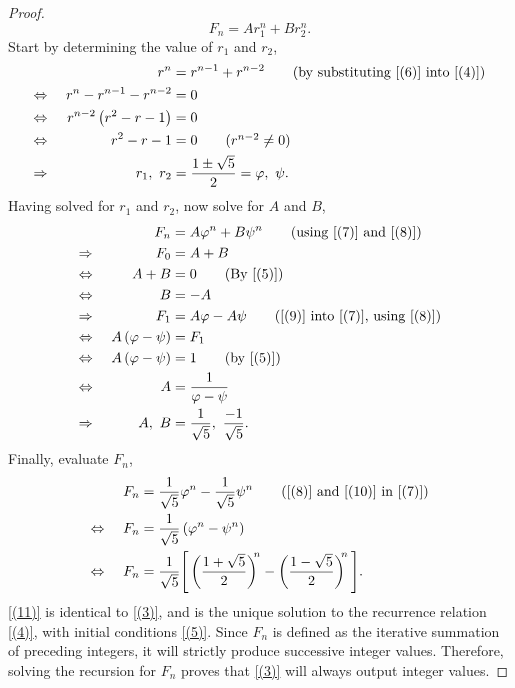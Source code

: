 \documentclass{article}
\begin{document}
\begin{proof}
\begin{equation}
        F_n = Ar_1^n + Br_2^n.
    \end{equation}
    Start by determining the value of $r_1$ and $r_2$,
    \begin{alignat}{2}
        && r^n &= r^{n-1} + r^{n-2} \nonumber \tag{by substituting \eqref{(6)} into \eqref{(4)}} \nonumber \\
        \Leftrightarrow&& \ r^n - r^{n-1} - r^{n-2} &= 0 \nonumber \\
        \Leftrightarrow&& r^{n-2} \left(r^2 - r - 1 \right) &= 0 \nonumber \\
        \Leftrightarrow&& r^2 - r - 1 &= 0 \nonumber \tag{$r^{n-2} \neq 0$} \\
        \label{(8)} \Rightarrow&& r_1,\ r_2 &= \frac{1\pm\sqrt{5}}{2} = \varphi,\ \psi.
    \end{alignat}
    Having solved for $r_1$ and $r_2$, now solve for $A$ and $B$,
    \begin{alignat}{2}
        && F_n &= A\varphi^n + B\psi^n \nonumber \tag{using \eqref{(7)} and \eqref{(8)}} \\
        \Rightarrow&& F_0 &= A + B \nonumber \\
        \Leftrightarrow&& A + B &= 0 \nonumber \tag{By \eqref{(5)}} \\
        \label{(9)} \Leftrightarrow&& B &= -A \\
        \Rightarrow&& F_1 &= A\varphi - A\psi \nonumber \tag{\eqref{(9)} into \eqref{(7)}, using \eqref{(8)}} \\ \Leftrightarrow&& \ A\left(\varphi - \psi\right) &= F_1 \nonumber \\
        \Leftrightarrow&& \ A\left(\varphi - \psi\right) &= 1 \nonumber \tag{by \eqref{(5)}} \\
        \Leftrightarrow&& A &= \frac{1}{\varphi -\psi} \nonumber \\ \label{(10)} \Rightarrow&& A,\ B &= \frac{1}{\sqrt{5}},\ \frac{-1}{\sqrt{5}}.
    \end{alignat}
    Finally, evaluate $F_n$,
    \begin{alignat}{2}
        && F_n &= \frac{1}{\sqrt{5}} \varphi^n - \frac{1}{\sqrt{5}} \psi^n \nonumber \tag{\eqref{(8)} and \eqref{(10)} in \eqref{(7)}} \\
        \Leftrightarrow&& F_n &= \frac{1}{\sqrt{5}} \left(\varphi^n - \psi^n \right) \nonumber \\
        \label{(11)}\Leftrightarrow&& \ F_n &= \frac{1}{\sqrt{5}} \Bigg[\left(\frac{1+\sqrt{5}}{2}\right)^{\!\!n}-\left(\frac{1-\sqrt{5}}{2}\right)^{\!\!n}\Bigg].
    \end{alignat}
    \eqref{(11)} is identical to \eqref{(3)}, and is the unique solution to the recurrence relation \eqref{(4)}, with initial conditions \eqref{(5)}. Since $F_n$ is defined as the iterative summation of preceding integers, it will strictly produce successive integer values. Therefore, solving the recursion for $F_n$ proves that \eqref{(3)} will always output integer values.
\end{proof}
\end{document}
